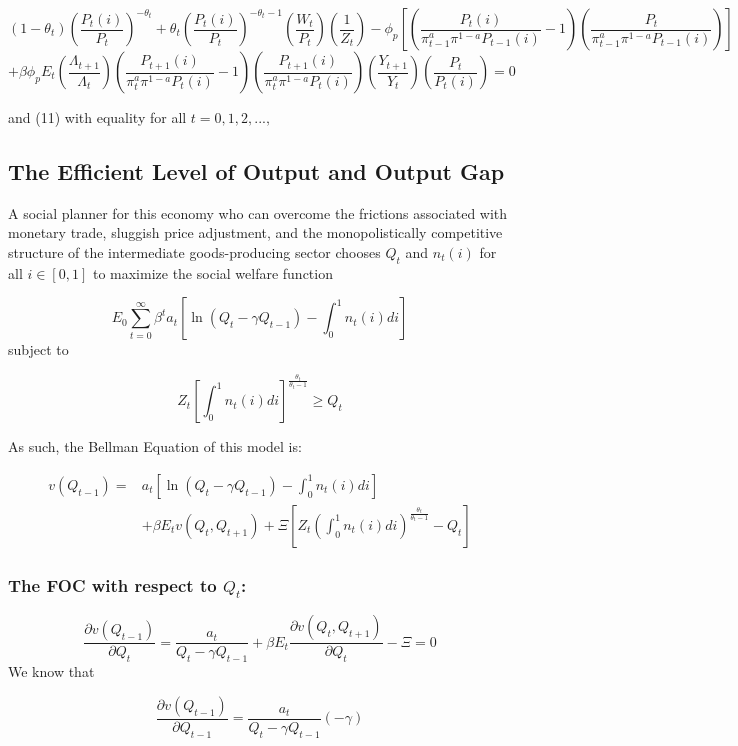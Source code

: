 \documentclass[11pt,preprint, authoryear]{elsarticle}
\numberwithin{equation}{section}
\numberwithin{figure}{section}
\numberwithin{table}{section}
\begin{document}
\[(1-\theta_t)(\frac{P_t(i)}{P_t})^{-\theta_t} + \theta_t(\frac{P_t(i)}{P_t})^{-\theta_t-1}(\frac{W_t}{P_t})(\frac{1}{Z_t}) - \phi_p[(\frac{P_t(i)}{\pi_{t-1}^a \pi^{1-a}P_{t-1}(i)}-1)(\frac{P_t}{\pi_{t-1}^a \pi^{1-a}P_{t-1}(i)})]\]
\[ + \beta\phi_pE_t(\frac{\Lambda_{t+1}}{\Lambda_{t}})(\frac{P_{t+1}(i)}{\pi_t^a\pi^{1-a}P_{t}(i)}-1)(\frac{P_{t+1}(i)}{\pi_t^a\pi^{1-a}P_{t}(i)})(\frac{Y_{t+1}}{Y_t})(\frac{P_t}{P_t(i)})=0 \tag{13}\]

and (11) with equality for all \(t=0,1,2,...,\)

\hypertarget{the-efficient-level-of-output-and-output-gap}{%
\subsection{The Efficient Level of Output and Output
Gap}\label{the-efficient-level-of-output-and-output-gap}}

A social planner for this economy who can overcome the frictions
associated with monetary trade, sluggish price adjustment, and the
monopolistically competitive structure of the intermediate
goods-producing sector chooses \(Q_t\) and \(n_t(i)\) for all
\(i \in [0,1]\) to maximize the social welfare function

\[E_0\sum_{t=0}^{\infty}\beta^ta_t[\ln(Q_t-\gamma Q_{t-1})-\int_0^1n_t(i) di]\]
subject to

\[Z_t[\int_0^1n_t(i) di]^{\frac{\theta_t}{\theta_t-1}} \ge Q_t\]

As such, the Bellman Equation of this model is:

\[\begin{aligned}
v(Q_{t-1}) = & a_t[\ln(Q_t-\gamma Q_{t-1})-\int_0^1n_t(i) di] \\
& + \beta E_tv(Q_t,Q_{t+1}) + \Xi [Z_t(\int_0^1n_t(i) di)^{\frac{\theta_t}{\theta_t-1}} - Q_t]
\end{aligned}\]

\hypertarget{the-foc-with-respect-to-q_t}{%
\subsubsection{\texorpdfstring{The FOC with respect to
\(Q_t\):}{The FOC with respect to Q\_t:}}\label{the-foc-with-respect-to-q_t}}

\[\frac{\partial v(Q_{t-1})}{\partial Q_t} = \frac{a_t}{Q_t-\gamma Q_{t-1}} + \beta E_t\frac{\partial v(Q_t, Q_{t+1})}{\partial Q_t} - \Xi =0\]
We know that

\[\frac{\partial v(Q_{t-1})}{\partial Q_{t-1}} = \frac{a_t}{Q_t-\gamma Q_{t-1}} (-\gamma)\]
\end{document}
